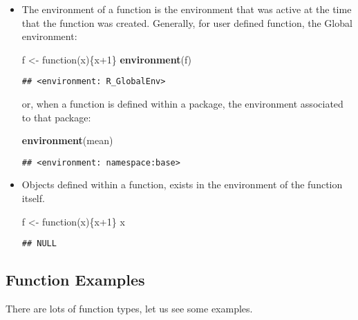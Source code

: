 \documentclass[]{book}
\newenvironment{Shaded}{\begin{snugshade}}{\end{snugshade}}
\newcommand{\KeywordTok}[1]{\textcolor[rgb]{0.13,0.29,0.53}{\textbf{{#1}}}}
\newcommand{\DecValTok}[1]{\textcolor[rgb]{0.00,0.00,0.81}{{#1}}}
\newcommand{\StringTok}[1]{\textcolor[rgb]{0.31,0.60,0.02}{{#1}}}
\newcommand{\NormalTok}[1]{{#1}}
\begin{document}
\begin{itemize}
\item
  The environment of a function is the environment that was active at
  the time that the function was created. Generally, for user defined
  function, the Global environment:

\begin{Shaded}
\begin{Highlighting}[]
\NormalTok{f <-}\StringTok{ }\NormalTok{function(x)\{x}\DecValTok{+1}\NormalTok{\}}
\KeywordTok{environment}\NormalTok{(f)}
\end{Highlighting}
\end{Shaded}

\begin{verbatim}
## <environment: R_GlobalEnv>
\end{verbatim}

  or, when a function is defined within a package, the environment
  associated to that package:

\begin{Shaded}
\begin{Highlighting}[]
\KeywordTok{environment}\NormalTok{(mean)}
\end{Highlighting}
\end{Shaded}

\begin{verbatim}
## <environment: namespace:base>
\end{verbatim}
\item
  Objects defined within a function, exists in the environment of the
  function itself.

\begin{Shaded}
\begin{Highlighting}[]
\NormalTok{f <-}\StringTok{ }\NormalTok{function(x)\{x}\DecValTok{+1}\NormalTok{\}}
\NormalTok{x}
\end{Highlighting}
\end{Shaded}

\begin{verbatim}
## NULL
\end{verbatim}
\end{itemize}

\subsection{Function Examples}\label{function-examples}

There are lots of function types, let us see some examples.
\end{document}
